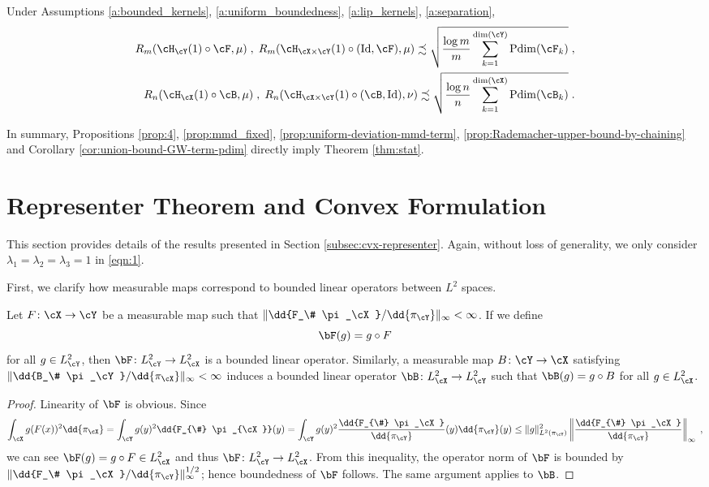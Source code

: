 \documentclass[11pt]{article}
\begin{document}
\begin{proposition}\label{prop:Rademacher-upper-bound-by-chaining}
	Under Assumptions \ref{a:bounded_kernels}, \ref{a:uniform_boundedness}, \ref{a:lip_kernels}, \ref{a:separation},
	\begin{align*}
		R_m(\cH_{\cY}(1)\circ \cF, \mu)\;, \; R_m(\cH_{\cX \times \cY}(1) \circ (\mathrm{Id}, \cF), \mu) \precsim \sqrt{\frac{\log m}{m} \sum_{k =1}^{{\rm dim}(\cY)} {\rm Pdim}(\cF_{k})}\;, \\
		R_n(\cH_{\cX}(1)\circ \cB, \mu)\;, \; R_n(\cH_{\cX \times \cY}(1) \circ (\cB, \mathrm{Id}), \nu) \precsim \sqrt{\frac{\log n}{n} \sum_{k =1}^{{\rm dim}(\cX)} {\rm Pdim}(\cB_{k})}\;.
	\end{align*}
\end{proposition}

In summary, Propositions \ref{prop:4}, \ref{prop:mmd_fixed}, \ref{prop:uniform-deviation-mmd-term}, \ref{prop:Rademacher-upper-bound-by-chaining} and Corollary \ref{cor:union-bound-GW-term-pdim} directly imply Theorem \ref{thm:stat}.



\section{Representer Theorem and Convex Formulation}
\label{sec:representation}

This section provides details of the results presented in Section \ref{subsec:cvx-representer}. Again, without loss of generality, we only consider $\lambda_1 = \lambda_2 = \lambda_3 = 1$ in \eqref{eqn:1}.

First, we clarify how measurable maps correspond to bounded linear operators between $L^2$ spaces.
\begin{proposition}
	Let $F \colon \cX \to \cY$ be a measurable map such that $\|\dd{F_\# \pi_\cX} / \dd{\pi_\cY}\|_\infty < \infty$. If we define
	\begin{equation*}
		\bF(g) = g \circ F
	\end{equation*}
	for all $g \in L^2_{\cY}$, then $\bF \colon L^2_{\cY} \to L^2_{\cX}$ is a bounded linear operator. Similarly, a measurable map $B \colon \cY \to \cX$ satisfying $\|\dd{B_\# \pi_\cY} / \dd{\pi_\cX}\|_\infty < \infty$ induces a bounded linear operator $\bB \colon L^2_{\cX} \to L^2_{\cY}$ such that $\bB(g) = g \circ B$ for all $g \in L^2_{\cX}$.
\end{proposition}
\begin{proof}[Proof]
	Linearity of $\bF$ is obvious. Since
	\begin{equation*}
		\int_{\cX} g(F(x))^2 \dd{\pi_{\cX}} = \int_{\cY} g(y)^2 \dd{F_{\#} \pi_{\cX}}(y) = \int_{\cY} g(y)^2 \frac{\dd{F_{\#} \pi_\cX}}{\dd{\pi_\cY}}(y) \dd{\pi_{\cY}}(y) \le \|g\|_{L^2(\pi_{\cY})}^2 \left\|\frac{\dd{F_{\#} \pi_\cX}}{\dd{\pi_\cY}} \right\|_\infty\;,
	\end{equation*}
	we can see $\bF(g) = g \circ F \in L^2_{\cX}$ and thus $\bF \colon L^2_{\cY} \to L^2_{\cX}$. From this inequality, the operator norm of $\bF$ is bounded by $\|\dd{F_\# \pi_\cX} / \dd{\pi_\cY}\|_\infty^{1 / 2}$; hence boundedness of $\bF$ follows. The same argument applies to $\bB$.
\end{proof}
\end{document}
